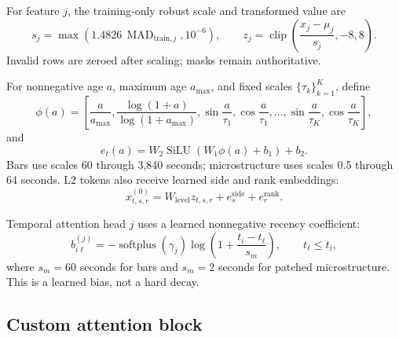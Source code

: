 \documentclass[10pt,letterpaper]{article}
\numberwithin{equation}{section}
\newcommand{\softplus}{\operatorname{softplus}}
\theoremstyle{definition}
\theoremstyle{remark}
\begin{document}
For feature \(j\), the training-only robust scale and transformed value are
\begin{equation}
s_j=\max\!\left(1.4826\,\operatorname{MAD}_{\mathrm{train},j},10^{-6}\right),
\qquad
z_j=\operatorname{clip}\!\left(\frac{x_j-\mu_j}{s_j},-8,8\right).
\label{eq:robust-scale}
\end{equation}
Invalid rows are zeroed after scaling; masks remain authoritative.

For nonnegative age \(a\), maximum age \(a_{\max}\), and fixed scales
\(\{\tau_k\}_{k=1}^{K}\), define
\begin{equation}
\phi(a)=\left[
\frac{a}{a_{\max}},
\frac{\log(1+a)}{\log(1+a_{\max})},
\sin\frac{a}{\tau_1},\cos\frac{a}{\tau_1},\ldots,
\sin\frac{a}{\tau_K},\cos\frac{a}{\tau_K}
\right],
\label{eq:time-features}
\end{equation}
and
\begin{equation}
e_t(a)=W_2\operatorname{SiLU}(W_1\phi(a)+b_1)+b_2.
\label{eq:time-mlp}
\end{equation}
Bars use scales 60 through 3,840 seconds; microstructure uses scales 0.5
through 64 seconds. L2 tokens also receive learned side and rank embeddings:
\begin{equation}
x_{t,s,r}^{(0)}
=W_{\mathrm{level}}z_{t,s,r}+e^{\mathrm{side}}_s+e^{\mathrm{rank}}_r.
\label{eq:l2-embedding}
\end{equation}

Temporal attention head \(j\) uses a learned nonnegative recency coefficient:
\begin{equation}
b_{i\ell}^{(j)}
=-\softplus(\gamma_j)\log\!\left(
1+\frac{t_i-t_\ell}{s_m}\right),\qquad t_\ell\leq t_i,
\label{eq:relative-bias}
\end{equation}
where \(s_m=60\) seconds for bars and \(s_m=2\) seconds for patched
microstructure. This is a learned bias, not a hard decay.

\subsection{Custom attention block}
\end{document}
